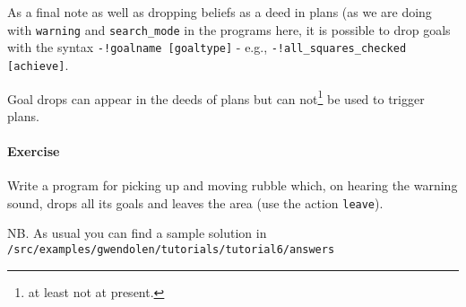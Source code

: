 \documentclass[a4]{article}
\begin{document}
As a final note as well as dropping beliefs as a deed in plans (as we are doing with \lstinline{warning} and \lstinline{search_mode} in the programs here, it is possible to drop goals with the syntax \lstinline{-!goalname [goaltype]} - e.g., \lstinline{-!all_squares_checked [achieve]}.

Goal drops can appear in the deeds of plans but can not\footnote{at least not at present.} be  used to trigger plans.

\paragraph{Exercise} Write a program for picking up and moving rubble which, on hearing the warning sound, drops all its goals and leaves the area (use the action \texttt{leave}).

\begin{sloppypar}
NB. As usual you can find a sample solution in \texttt{/src/examples/gwendolen/tutorials/tutorial6/answers}
\end{sloppypar}
\end{document}
